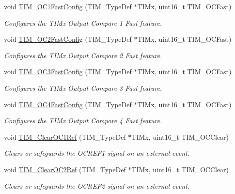 \begin{DoxyCompactItemize}
void \hyperlink{group___t_i_m_gaec82031ca62f31f5483195c09752a83a}{T\-I\-M\-\_\-\-O\-C1\-Fast\-Config} (T\-I\-M\-\_\-\-Type\-Def $\ast$T\-I\-Mx, uint16\-\_\-t T\-I\-M\-\_\-\-O\-C\-Fast)
\begin{DoxyCompactList}\small\item\em Configures the T\-I\-Mx Output Compare 1 Fast feature. \end{DoxyCompactList}\item 
void \hyperlink{group___t_i_m_ga413359c87f46c69f1ffe2dc8fb3a65e7}{T\-I\-M\-\_\-\-O\-C2\-Fast\-Config} (T\-I\-M\-\_\-\-Type\-Def $\ast$T\-I\-Mx, uint16\-\_\-t T\-I\-M\-\_\-\-O\-C\-Fast)
\begin{DoxyCompactList}\small\item\em Configures the T\-I\-Mx Output Compare 2 Fast feature. \end{DoxyCompactList}\item 
void \hyperlink{group___t_i_m_gab2f3698e6e56bd9b0a4be7056ba789e1}{T\-I\-M\-\_\-\-O\-C3\-Fast\-Config} (T\-I\-M\-\_\-\-Type\-Def $\ast$T\-I\-Mx, uint16\-\_\-t T\-I\-M\-\_\-\-O\-C\-Fast)
\begin{DoxyCompactList}\small\item\em Configures the T\-I\-Mx Output Compare 3 Fast feature. \end{DoxyCompactList}\item 
void \hyperlink{group___t_i_m_ga58279a04e8ea5333f1079d3cce8dde12}{T\-I\-M\-\_\-\-O\-C4\-Fast\-Config} (T\-I\-M\-\_\-\-Type\-Def $\ast$T\-I\-Mx, uint16\-\_\-t T\-I\-M\-\_\-\-O\-C\-Fast)
\begin{DoxyCompactList}\small\item\em Configures the T\-I\-Mx Output Compare 4 Fast feature. \end{DoxyCompactList}\item 
void \hyperlink{group___t_i_m_ga34e926cd8a99cfcc7480b2d6de5118b6}{T\-I\-M\-\_\-\-Clear\-O\-C1\-Ref} (T\-I\-M\-\_\-\-Type\-Def $\ast$T\-I\-Mx, uint16\-\_\-t T\-I\-M\-\_\-\-O\-C\-Clear)
\begin{DoxyCompactList}\small\item\em Clears or safeguards the O\-C\-R\-E\-F1 signal on an external event. \end{DoxyCompactList}\item 
void \hyperlink{group___t_i_m_gac474ebc815d24c8a589969e0c68b27b0}{T\-I\-M\-\_\-\-Clear\-O\-C2\-Ref} (T\-I\-M\-\_\-\-Type\-Def $\ast$T\-I\-Mx, uint16\-\_\-t T\-I\-M\-\_\-\-O\-C\-Clear)
\begin{DoxyCompactList}\small\item\em Clears or safeguards the O\-C\-R\-E\-F2 signal on an external event. \end{DoxyCompactList}\item 

\end{DoxyCompactItemize}
